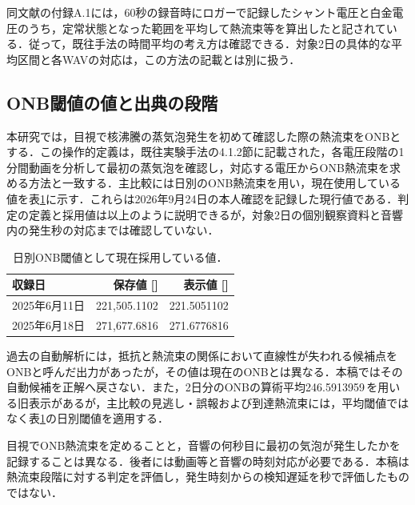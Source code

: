 同文献の付録A.1には，60秒の録音時にロガーで記録したシャント電圧と白金電圧のうち，定常状態となった範囲を平均して熱流束等を算出したと記されている．従って，既往手法の時間平均の考え方は確認できる．対象2日の具体的な平均区間と各WAVの対応は，この方法の記載とは別に扱う．

\subsection{ONB閾値の値と出典の段階}
本研究では，目視で核沸騰の蒸気泡発生を初めて確認した際の熱流束をONBとする．この操作的定義は，既往実験手法の4.1.2節\cite{shibasaki2025}に記載された，各電圧段階の1分間動画を分析して最初の蒸気泡を確認し，対応する電圧からONB熱流束を求める方法と一致する．主比較には日別のONB熱流束を用い，現在使用している値を表\ref{tab:onbthreshold}に示す．これらは2026年9月24日の本人確認を記録した現行値\cite{localONB}である．判定の定義と採用値は以上のように説明できるが，対象2日の個別観察資料と音響内の発生秒の対応までは確認していない．
\begin{table}[htbp]
\centering
\caption{日別ONB閾値として現在採用している値．}
\label{tab:onbthreshold}
\begin{tabular}{lrr}
\toprule
収録日 & 保存値 [\wm{}] & 表示値 [\kw{}] \\
\midrule
2025年6月11日 & 221,505.1102 & 221.5051102 \\
2025年6月18日 & 271,677.6816 & 271.6776816 \\
\bottomrule
\end{tabular}
\end{table}

過去の自動解析には，抵抗と熱流束の関係において直線性が失われる候補点をONBと呼んだ出力があったが，その値は現在のONBとは異なる．本稿ではその自動候補を正解へ戻さない．また，2日分のONBの算術平均246.5913959\,\kw{}を用いる旧表示があるが，主比較の見逃し・誤報および到達熱流束には，平均閾値ではなく表\ref{tab:onbthreshold}の日別閾値を適用する．

目視でONB熱流束を定めることと，音響の何秒目に最初の気泡が発生したかを記録することは異なる．後者には動画等と音響の時刻対応が必要である．本稿は熱流束段階に対する判定を評価し，発生時刻からの検知遅延を秒で評価したものではない．

